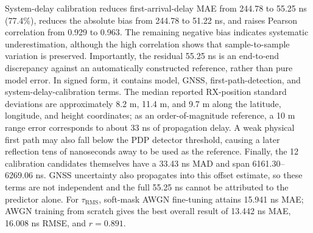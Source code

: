 System-delay calibration reduces first-arrival-delay MAE from 244.78 to 55.25 ns (77.4\%), reduces
the absolute bias from 244.78 to 51.22 ns, and raises Pearson correlation from 0.929 to 0.963. The
remaining negative bias indicates systematic underestimation, although the high correlation shows
that sample-to-sample variation is preserved. Importantly, the residual 55.25 ns is an end-to-end
discrepancy against an automatically constructed reference, rather than pure model error. In signed
form, it contains model, GNSS, first-path-detection, and system-delay-calibration terms. The median
reported RX-position standard deviations are approximately 8.2 m, 11.4 m, and 9.7 m along the
latitude, longitude, and height coordinates; as an order-of-magnitude reference, a 10 m range error
corresponds to about 33 ns of propagation delay. A weak physical first path may also fall below the
PDP detector threshold, causing a later reflection tens of nanoseconds away to be used as the
reference. Finally, the 12 calibration candidates themselves have a 33.43 ns MAD and span
6161.30--6269.06 ns. GNSS uncertainty also propagates into this offset estimate, so these terms are
not independent and the full 55.25 ns cannot be attributed to the predictor alone. For
\(\tau_{\mathrm{RMS}}\), soft-mask AWGN fine-tuning attains 15.941 ns MAE; AWGN training from scratch
gives the best overall result of 13.442 ns MAE, 16.008 ns RMSE, and \(r=0.891\).

